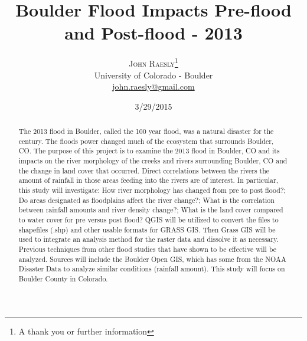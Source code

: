 \documentclass[twoside]{article}
\title{\vspace{-15mm}\fontsize{24pt}{10pt}\selectfont\textbf{Boulder Flood Impacts Pre-flood and Post-flood - 2013}} %
\author{
\large
\textsc{John Raesly}\thanks{A thank you or further information}\\[2mm] %
\normalsize University of Colorado - Boulder \\ %
\normalsize \href{mailto:john.raesly@gmail.com}{john.raesly@gmail.com} %
\vspace{-3mm}
}
\date{3/29/2015}
\begin{document}
\maketitle %

\thispagestyle{fancy} %


\begin{abstract}

The 2013 flood in Boulder, called the 100 year flood, was a natural disaster for the century. The floods power changed much of the ecosystem that surrounds Boulder, CO. The purpose of this project is to examine the 2013 flood in Boulder, CO and its impacts on the river morphology of the creeks and rivers surrounding Boulder, CO and the change in land cover that occurred. Direct correlations between the rivers the amount of rainfall in those areas feeding into the rivers are of interest. In particular, this study will investigate: How river morphology has changed from pre to post flood?; Do areas designated as floodplains affect the river change?; What is the correlation between rainfall amounts and river density change?; What is the land cover compared to water cover for pre versus post flood? QGIS will be utilized to convert the files to shapefiles (.shp) and other usable formats for GRASS GIS. Then Grass GIS will be used to integrate an analysis method for the raster data and dissolve it as necessary. Previous techniques from other flood studies that have shown to be effective will be analyzed. Sources will include the Boulder Open GIS, which has some from the NOAA Disaster Data to analyze similar conditions (rainfall amount). This study will focus on Boulder County in Colorado. 

\end{abstract}

\end{document}
